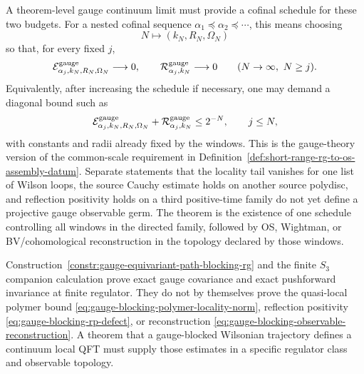 A theorem-level gauge continuum limit must provide a cofinal schedule for
these two budgets.  For a nested cofinal sequence
\(\alpha_1\preceq\alpha_2\preceq\cdots\), this means choosing
\[
  N\longmapsto (k_N,R_N,\Omega_N)
\]
so that, for every fixed \(j\),
\begin{equation}
  \mathcal E_{\alpha_j,k_N,R_N,\Omega_N}^{\rm gauge}\longrightarrow0,
  \qquad
  \mathcal R_{\alpha_j,k_N}^{\rm gauge}\longrightarrow0
  \qquad(N\to\infty,\ N\ge j).
  \label{eq:gauge-common-schedule-limit}
\end{equation}
Equivalently, after increasing the schedule if necessary, one may demand a
diagonal bound such as
\[
  \mathcal E_{\alpha_j,k_N,R_N,\Omega_N}^{\rm gauge}
  +
  \mathcal R_{\alpha_j,k_N}^{\rm gauge}
  \le 2^{-N},
  \qquad j\le N ,
\]
with constants and radii already fixed by the windows.  This is the
gauge-theory version of the common-scale requirement in
Definition~\ref{def:short-range-rg-to-os-assembly-datum}.  Separate
statements that the locality tail vanishes for one list of Wilson loops,
the source Cauchy estimate holds on another source polydisc, and reflection
positivity holds on a third positive-time family do not yet define a
projective gauge observable germ.  The theorem is the existence of one
schedule controlling all windows in the directed family, followed by OS,
Wightman, or BV/cohomological reconstruction in the topology declared by
those windows.

\begin{warning}
\label{warn:finite-gauge-blocking-not-continuum-proof}
Construction~\ref{constr:gauge-equivariant-path-blocking-rg} and the finite
\(S_3\) companion calculation prove exact gauge covariance and exact
pushforward invariance at finite regulator.  They do not by themselves prove
the quasi-local polymer bound
\eqref{eq:gauge-blocking-polymer-locality-norm}, reflection positivity
\eqref{eq:gauge-blocking-rp-defect}, or reconstruction
\eqref{eq:gauge-blocking-observable-reconstruction}.  A theorem that a
gauge-blocked Wilsonian trajectory defines a continuum local QFT must supply
those estimates in a specific regulator class and observable topology.
\end{warning}

